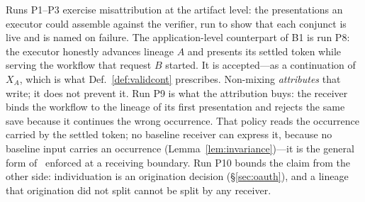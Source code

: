 \documentclass[conference]{IEEEtran}
\begin{document}
Runs P1--P3 exercise misattribution at the artifact level: the presentations an executor could assemble against the verifier, run to show that each conjunct is live and is named on failure. The application-level counterpart of B1 is run P8: the executor honestly advances lineage $A$ and presents its settled token while serving the workflow that request $B$ started. It is accepted---as a continuation of $X_A$, which is what Def.~\ref{def:validcont} prescribes. Non-mixing \emph{attributes} that write; it does not prevent it. Run P9 is what the attribution buys: the receiver binds the workflow to the lineage of its first presentation and rejects the same save because it continues the wrong occurrence. That policy reads the occurrence carried by the settled token; no baseline receiver can express it, because no baseline input carries an occurrence (Lemma~\ref{lem:invariance})---it is the general form of~\cite[Thm.~4]{gallo2026poc} enforced at a receiving boundary. Run P10 bounds the claim from the other side: individuation is an origination decision (\S\ref{sec:oauth}), and a lineage that origination did not split cannot be split by any receiver.
\end{document}
